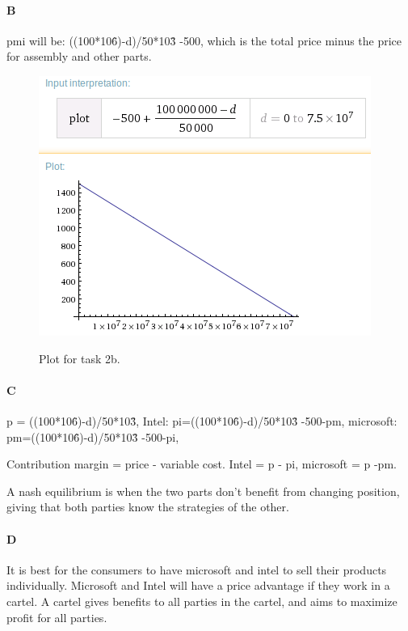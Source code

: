 \documentclass[12pt, a4paper]{article}
\begin{document}
\paragraph{B}
pmi will be: ((100*10\^6)-d)/50*10\^3 -500, which is the total price minus the
price for assembly and other parts. 
\begin{figure}[htb]
    \centering
    \includegraphics[width=\textwidth]{plot1}  
    \label{plot1}
    \caption{}
Plot for task 2b.
\end{figure}

\paragraph{C}
p = ((100*10\^6)-d)/50*10\^3,
Intel: pi=((100*10\^6)-d)/50*10\^3 -500-pm,
microsoft: pm=((100*10\^6)-d)/50*10\^3 -500-pi,

Contribution margin = price - variable cost.
Intel = p - pi,
microsoft = p -pm. 

A nash equilibrium is when the two parts don't benefit from changing position,
giving that both parties know the strategies of the other. 

\paragraph{D}
It is best for the consumers to have microsoft and intel to sell their products
individually. Microsoft and Intel will have a price advantage if they work in a
cartel. A cartel gives benefits to all parties in the cartel, and aims to
maximize profit for all parties. 
\end{document}

